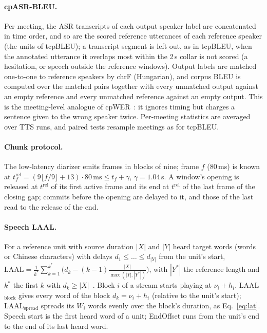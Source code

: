 \paragraph{cpASR-BLEU.} Per meeting, the ASR transcripts of each output speaker label are concatenated in time order,
and so are the scored reference utterances of each reference speaker (the units of tcpBLEU); a transcript segment is
left out, as in tcpBLEU, when the annotated utterance it overlaps most within the 2\,s collar is not scored (a
hesitation, or speech outside the reference windows). Output labels are matched one-to-one to reference speakers by
chrF (Hungarian), and corpus BLEU is computed over the matched pairs together with every unmatched output against an
empty reference and every unmatched reference against an empty output. This is the meeting-level analogue of
cpWER~\citep{watanabe2020chime6}: it ignores timing but charges a sentence given to the wrong speaker twice. Per-meeting
statistics are averaged over TTS runs, and paired tests resample meetings as for tcpBLEU.

\paragraph{Chunk protocol.} The low-latency diarizer emits frames in blocks of nine; frame $f$ (80\,ms) is known at
$t^{\mathrm{rel}}_f=(9\lfloor f/9\rfloor+13)\cdot 80\,\text{ms}\le t_f+\gamma$, $\gamma=1.04$\,s. A window's opening is
released at $t^{\mathrm{rel}}$ of its first active frame and its end at $t^{\mathrm{rel}}$ of the last frame of the
closing gap; commits before the opening are delayed to it, and those of the last read to the release of the end.

\paragraph{Speech LAAL.} For a reference unit with source duration $|X|$ and $|Y|$ heard target words (words or Chinese
characters) with delays $d_1\le\dots\le d_{|Y|}$ from the unit's start,
$\mathrm{LAAL}=\frac{1}{k^\ast}\sum_{k=1}^{k^\ast}\big(d_k-(k-1)\frac{|X|}{\max(|Y|,|Y^\ast|)}\big)$, with $|Y^\ast|$ the
reference length and $k^\ast$ the first $k$ with $d_k\ge|X|$~\citep{papi2022over}. Block $i$ of a stream starts playing
at $\nu_i+h_i$. LAAL$_\text{block}$ gives every word of the block $d_k=\nu_i+h_i$ (relative to the unit's start);
LAAL$_\text{spread}$ spreads its $W_i$ words evenly over the block's duration, as Eq.~\eqref{eq:lat}. Speech start is the
first heard word of a unit; EndOffset runs from the unit's end to the end of its last heard word.

